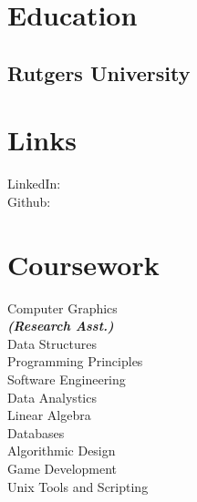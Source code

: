 \documentclass[]{deedy-resume-openfont}
\begin{document}
%
%


%
%

\begin{minipage}[t]{0.33\textwidth} 


\section{Education} 

\subsection{Rutgers University}
\sectionsep
{}
\sectionsep


\section{Links} 
LinkedIn:  \href{https://www.linkedin.com/in/dougjrudolph}{} \\
Github: \href{https://github.com/11}
{} \\
\sectionsep


\section{Coursework}
Computer Graphics \\
{\footnotesize \textit{\textbf{(Research Asst.) }}} \\
Data Structures \\
Programming Principles\\
Software Engineering\\
Data Analystics\\
Linear Algebra\\
Databases \\
Algorithmic Design \\ 
Game Development \\
Unix Tools and Scripting \\
\sectionsep


\end{minipage}
\end{document}
